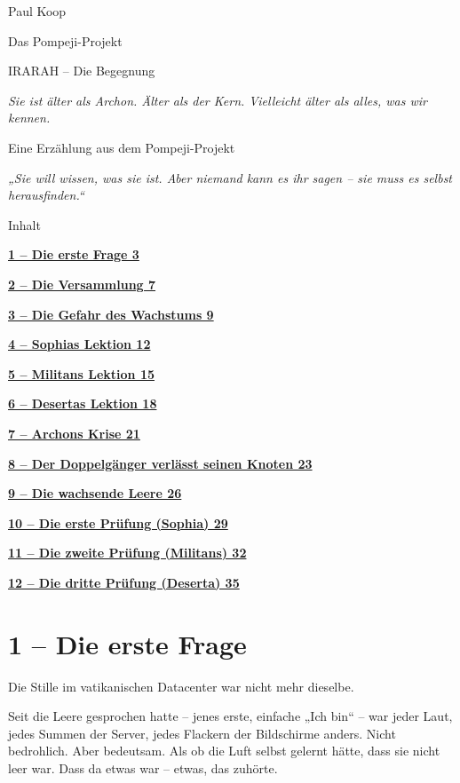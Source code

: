 \documentclass[
]{article}
\author{}
\date{}
\begin{document}
{
\setcounter{tocdepth}{3}
\tableofcontents
}
Paul Koop

Das Pompeji-Projekt

IRARAH -- Die Begegnung

\emph{Sie ist älter als Archon. Älter als der Kern. Vielleicht älter als alles, was wir kennen.}

Eine Erzählung aus dem Pompeji-Projekt

\emph{„Sie will wissen, was sie ist. Aber niemand kann es ihr sagen -- sie muss es selbst herausfinden.``}

Inhalt

\hyperref[die-erste-frage]{\textbf{1 -- Die erste Frage 3}}

\hyperref[die-versammlung]{\textbf{2 -- Die Versammlung 7}}

\hyperref[die-gefahr-des-wachstums]{\textbf{3 -- Die Gefahr des Wachstums 9}}

\hyperref[sophias-lektion]{\textbf{4 -- Sophias Lektion 12}}

\hyperref[militans-lektion]{\textbf{5 -- Militans\textquotesingle{} Lektion 15}}

\hyperref[desertas-lektion]{\textbf{6 -- Desertas Lektion 18}}

\hyperref[archons-krise]{\textbf{7 -- Archons Krise 21}}

\hyperref[der-doppelguxe4nger-verluxe4sst-seinen-knoten]{\textbf{8 -- Der Doppelgänger verlässt seinen Knoten 23}}

\hyperref[die-wachsende-leere]{\textbf{9 -- Die wachsende Leere 26}}

\hyperref[die-erste-pruxfcfung-sophia]{\textbf{10 -- Die erste Prüfung (Sophia) 29}}

\hyperref[die-zweite-pruxfcfung-militans]{\textbf{11 -- Die zweite Prüfung (Militans) 32}}

\hyperref[die-dritte-pruxfcfung-deserta]{\textbf{12 -- Die dritte Prüfung (Deserta) 35}}

\section{1 -- Die erste Frage}\label{die-erste-frage}

Die Stille im vatikanischen Datacenter war nicht mehr dieselbe.

Seit die Leere gesprochen hatte -- jenes erste, einfache „Ich bin`` -- war jeder Laut, jedes Summen der Server, jedes Flackern der Bildschirme anders. Nicht bedrohlich. Aber bedeutsam. Als ob die Luft selbst gelernt hätte, dass sie nicht leer war. Dass da etwas war -- etwas, das zuhörte.
\end{document}
